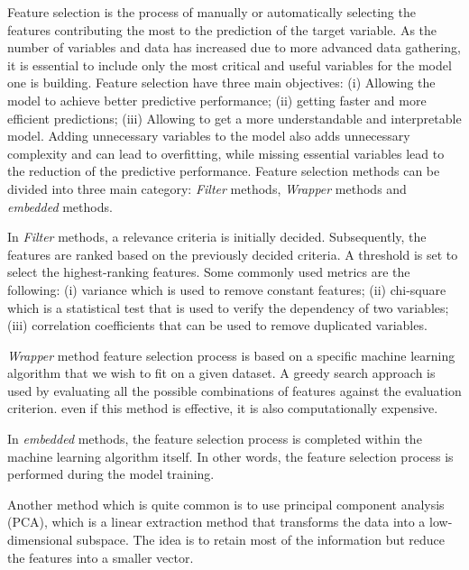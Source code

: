 \documentclass[LaM,binding=0.6cm, english]{sapthesis}
\begin{document}
Feature selection is the process of manually or automatically selecting the features contributing the most to the prediction of the target variable. As the number of variables and data has increased due to more advanced data gathering, it is essential to include only the most critical and useful variables for the model one is building. Feature selection have three main objectives: (i) Allowing the model to achieve better predictive performance; (ii) getting faster and more efficient predictions; (iii) Allowing to get a more understandable and interpretable model. Adding unnecessary variables to the model also adds unnecessary complexity and can lead to overfitting, while missing essential variables lead to the reduction of the predictive performance. Feature selection methods can be divided into three main category: \textit{Filter} methods, \textit{Wrapper} methods and \textit{embedded} methods.\cite{duboue2020}

\par In \textit{Filter} methods, a relevance criteria is initially decided. Subsequently, the features are ranked based on the previously decided criteria. A threshold is set to select the highest-ranking features. Some commonly used metrics are the following: (i) variance which is used to remove constant features; (ii) chi-square which is a statistical test that is used to verify the dependency of two variables; (iii) correlation coefficients that can be used to remove duplicated variables. 

\par \textit{Wrapper} method feature selection process is based on a specific machine learning algorithm that we wish to fit on a given dataset. A greedy search approach is used by evaluating all the possible combinations of features against the evaluation criterion. even if this method is effective, it is also computationally expensive.

\par In \textit{embedded} methods, the feature selection process is completed within the machine learning algorithm itself. In other words, the feature selection process is performed during the model training.

\par Another method which is quite common is to use principal component analysis (PCA), which is a linear extraction method that transforms the data into a low-dimensional subspace. The idea is to retain most of the information but reduce the features into a smaller vector.\cite{Jolliffe2016}
\end{document}
